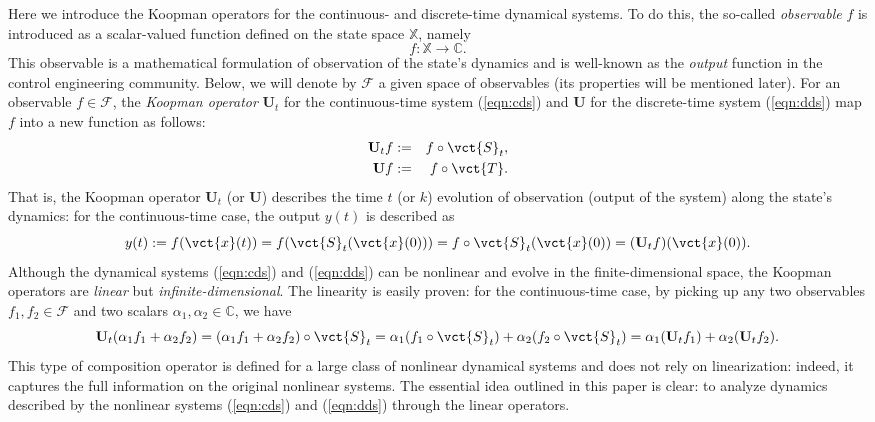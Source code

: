 \documentclass[a4paper,10pt]{article}
\def\bU{{\mathbf{U}}}
\def\bbX{{\mathbb{X}}}
\def\bbC{{\mathbb{C}}}
\def\cF{{\mathcal{F}}}
\begin{document}
%
Here we introduce the Koopman operators for the continuous- and discrete-time dynamical systems.  
To do this, the so-called \emph{observable} $f$ is introduced as a scalar-valued function defined on the state space $\bbX$, namely
\[
f: \bbX\to\bbC.
\]
This observable is a mathematical formulation of observation of the state's dynamics and is well-known as the \emph{output} function in the control engineering community.  
Below, we will denote by $\cF$ a given space of observables (its properties will be mentioned later).  
For an observable $f\in\cF$, the \emph{Koopman operator} $\bU_t$ for the continuous-time system (\ref{eqn:cds}) and $\bU$ for the discrete-time system (\ref{eqn:dds}) map $f$ into a new function as follows:
\begin{eqnarray}
\bU_tf &:=& f\circ\vct{S}_t,
\nonumber\\ %
\bU f &:=& f\circ\vct{T}.
\nonumber %
\end{eqnarray}
That is, the Koopman operator $\bU_t$ (or $\bU$) describes the time $t$ (or $k$) evolution of observation (output of the system) along the state's dynamics:  for the continuous-time case, the output $y(t)$ is described as
\begin{equation}
y(t):=f(\vct{x}(t))=f(\vct{S}_t(\vct{x}(0)))
=f\circ\vct{S}_t(\vct{x}(0))
=(\bU_tf)(\vct{x}(0)).
\label{eqn:output_cds}
\end{equation}
Although the dynamical systems (\ref{eqn:cds}) and (\ref{eqn:dds}) can be nonlinear and evolve in the finite-dimensional space, the Koopman operators are \emph{linear} but \emph{infinite-dimensional}.  
The linearity is easily proven: for the continuous-time case, by picking up any two observables $f_1,f_2\in\cF$ and two scalars $\alpha_1,\alpha_2\in\bbC$, we have
\[
\bU_t(\alpha_1f_1+\alpha_2f_2)=(\alpha_1f_1+\alpha_2f_2)\circ\vct{S}_t
=\alpha_1(f_1\circ\vct{S}_t)+\alpha_2(f_2\circ\vct{S}_t)
=\alpha_1(\bU_tf_1)+\alpha_2(\bU_tf_2).
\]
This type of composition operator is defined for a large class of nonlinear dynamical systems \cite{Lasota_CFN} and does not rely on linearization: indeed, it captures the full information on the original nonlinear systems.  
The essential idea outlined in this paper is clear: to analyze dynamics described by the nonlinear systems (\ref{eqn:cds}) and (\ref{eqn:dds}) through the linear operators.
\end{document}
